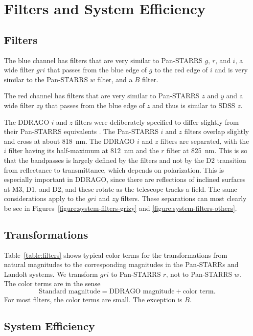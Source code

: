 \chapter{Filters and System Efficiency}

\section{Filters}

The blue channel has filters that are very similar to Pan-STARRS $g$, $r$, and $i$, a wide filter $gri$ that passes from the blue edge of $g$ to the red edge of $i$ and is very similar to the Pan-STARRS $w$ filter, and a $B$ filter.

The red channel has filters that are very similar to Pan-STARRS $z$ and $y$ and a wide filter $zy$ that passes from the blue edge of $z$ and thus is similar to SDSS $z$.

The DDRAGO $i$ and $z$ filters were deliberately specified to differ slightly from their Pan-STARRS equivalents \citep{Tonry-2012}. The Pan-STARRS $i$ and $z$ filters overlap slightly and cross at about 818~nm. The DDRAGO $i$ and $z$ filters are separated, with the $i$ filter having its half-maximum at 812~nm and the $r$ filter at 825~nm. This is so that the bandpasses is largely defined by the filters and not by the D2 transition from reflectance to transmittance, which depends on polarization. This is especially important in DDRAGO, since there are reflections of inclined surfaces at M3, D1, and D2, and these rotate as the telescope tracks a field. The same considerations apply to the $gri$ and $zy$ filters. These separations can most clearly be see in Figures~\ref{figure:system-filters-grizy} and \ref{figure:system-filters-others}.


\section{Transformations}

Table~\ref{table:filters} shows typical color terms for the transformations from natural magnitudes to the corresponding magnitudes in the Pan-STARRs and Landolt systems. We transform $gri$ to Pan-STARRS $r$, not to Pan-STARRS $w$. The color terms are in the sense
$$
\mbox{Standard magnitude} = \mbox{DDRAGO magnitude} + \mbox{color term}.
$$
For most filters, the color terms are small. The exception is $B$.

\section{System Efficiency}

